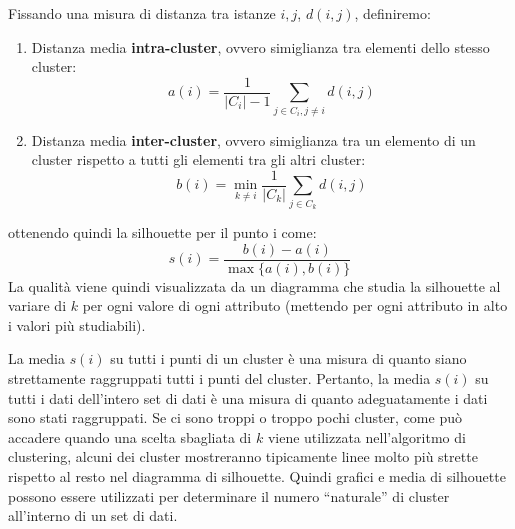 Fissando una misura di distanza tra istanze $i, j$, $d(i, j)$, definiremo:
\begin{enumerate}
    \item Distanza media \textbf{intra-cluster}, ovvero simiglianza tra elementi
          dello stesso cluster:
          \begin{equation}
              a(i) = \frac{1}{|C_i| - 1} \sum_{j \in C_i, j \neq i} d(i, j)
          \end{equation}
    \item Distanza media \textbf{inter-cluster}, ovvero simiglianza tra un elemento
          di un cluster rispetto a tutti gli elementi tra gli altri cluster:
          \begin{equation}
              b(i) = \min_{k \neq i} \frac{1}{|C_k|} \sum_{j \in C_k} d(i, j)
          \end{equation}
\end{enumerate}
ottenendo quindi la silhouette per il punto i come:
\begin{equation}
    s(i) = \frac{b(i) - a(i)}{\max\{a(i), b(i)\}}
\end{equation}
La qualità viene quindi visualizzata da un diagramma che studia la silhouette al
variare di $k$ per ogni valore di ogni attributo (mettendo per ogni attributo in
alto i valori più studiabili).

La media $s(i)$ su tutti i punti di un cluster è una misura di quanto siano
strettamente raggruppati tutti i punti del cluster. Pertanto, la media $s(i)$ su
tutti i dati dell'intero set di dati è una misura di quanto adeguatamente i dati
sono stati raggruppati. Se ci sono troppi o troppo pochi cluster, come può accadere
quando una scelta sbagliata di $k$ viene utilizzata nell'algoritmo di clustering,
alcuni dei cluster mostreranno tipicamente linee molto più strette rispetto al
resto nel diagramma di silhouette. Quindi grafici e media di silhouette possono
essere utilizzati per determinare il numero “naturale” di cluster all'interno di
un set di dati.